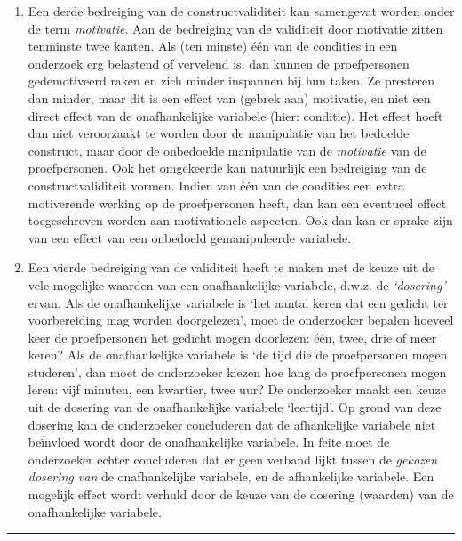 \documentclass[
]{book}
\begin{document}
\begin{enumerate}
\def\labelenumi{\arabic{enumi}.}
\setcounter{enumi}{2}
\item
  Een derde bedreiging van de constructvaliditeit kan samengevat
  worden onder de term \emph{motivatie}. Aan de bedreiging van de validiteit
  door motivatie zitten tenminste twee kanten. Als (ten minste) één van de
  condities in een onderzoek erg belastend of vervelend is, dan kunnen de
  proefpersonen gedemotiveerd raken en zich minder inspannen bij hun
  taken. Ze presteren dan minder, maar dit is een effect van (gebrek aan)
  motivatie, en niet een direct effect van de onafhankelijke variabele
  (hier: conditie). Het effect hoeft dan niet veroorzaakt te worden door
  de manipulatie van het bedoelde construct, maar door de onbedoelde
  manipulatie van de \emph{motivatie} van de proefpersonen. Ook het omgekeerde
  kan natuurlijk een bedreiging van de constructvaliditeit vormen. Indien
  van één van de condities een extra motiverende werking op de
  proefpersonen heeft, dan kan een eventueel effect toegeschreven worden
  aan motivationele aspecten. Ook dan kan er sprake zijn van een effect
  van een onbedoeld gemanipuleerde variabele.
\item
  Een vierde bedreiging van de validiteit heeft te maken met de keuze
  uit de vele mogelijke waarden van een onafhankelijke variabele, d.w.z.
  de \emph{`dosering'} ervan. Als de onafhankelijke variabele is `het aantal
  keren dat een gedicht ter voorbereiding mag worden doorgelezen', moet de
  onderzoeker bepalen hoeveel keer de proefpersonen het gedicht mogen
  doorlezen: één, twee, drie of meer keren? Als de onafhankelijke
  variabele is `de tijd die de proefpersonen mogen studeren', dan moet de
  onderzoeker kiezen hoe lang de proefpersonen mogen leren: vijf minuten,
  een kwartier, twee uur? De onderzoeker maakt een keuze uit de dosering
  van de onafhankelijke variabele `leertijd'. Op grond van deze dosering
  kan de onderzoeker concluderen dat de afhankelijke variabele niet
  beïnvloed wordt door de onafhankelijke variabele. In feite moet de
  onderzoeker echter concluderen dat er geen verband lijkt tussen de
  \emph{gekozen dosering van} de onafhankelijke variabele, en de afhankelijke
  variabele. Een mogelijk effect wordt verhuld door de keuze van de
  dosering (waarden) van de onafhankelijke variabele.
\end{enumerate}

\begin{center}\rule{0.5\linewidth}{0.5pt}\end{center}
\end{document}
